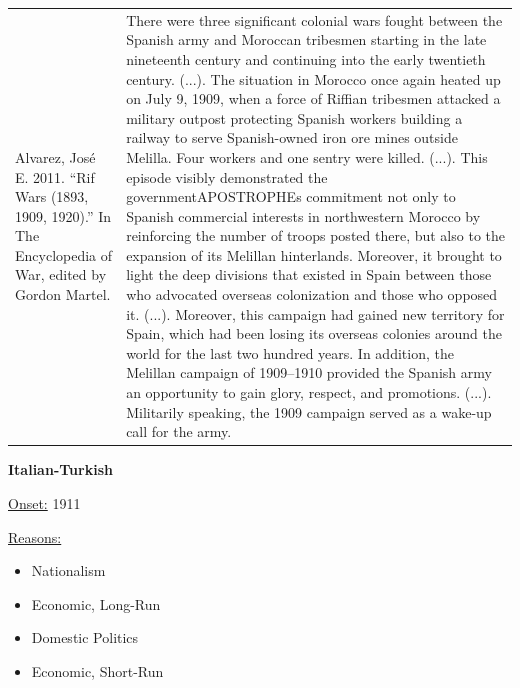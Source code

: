 {\begin{longtable}{p{}p{}}
\\
Alvarez, José E. 2011. “Rif Wars (1893, 1909, 1920).” In The Encyclopedia of War, edited by Gordon Martel. & There were three significant colonial wars fought between the Spanish army and Moroccan tribesmen starting in the late nineteenth century and continuing into the early twentieth century. (...). The situation in Morocco once again heated up on July 9, 1909, when a force of Riffian tribesmen attacked a military outpost protecting Spanish workers building a railway to serve Spanish-owned iron ore mines outside Melilla. Four workers and one sentry were killed. (...). This episode visibly demonstrated the governmentAPOSTROPHEs commitment not only to Spanish commercial interests in northwestern Morocco by reinforcing the number of troops posted there, but also to the expansion of its Melillan hinterlands. Moreover, it brought to light the deep divisions that existed in Spain between those who advocated overseas colonization and those who opposed it. (...). Moreover, this campaign had gained new territory for Spain, which had been losing its overseas colonies around the world for the last two hundred years. In addition, the Melillan campaign of 1909–1910 provided the Spanish army an opportunity to gain glory, respect, and promotions. (...). Militarily speaking, the 1909 campaign served as a wake-up call for the army.
\\
\end{longtable}}
\clearpage
         \textbf{Italian-Turkish} 

          \underline{Onset:} 1911         

\underline{Reasons:}
\begin{itemize}
\item Nationalism
\item Economic, Long-Run
\item Domestic Politics
\item Economic, Short-Run
\end{itemize}

